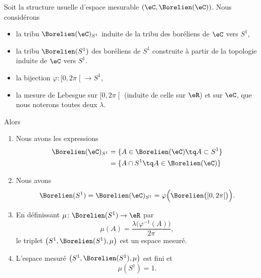 \begin{proposition}      \label{PROPooHMSCooRIjcJq}
	Soit la structure usuelle d'espace mesurable \( (\eC,\Borelien(\eC))\). Nous considérons
	\begin{itemize}
		\item la tribu \( \Borelien(\eC)_{S^1}\) induite de la tribu des boréliens  de \( \eC\) vers \( S^1\),
		\item la tribu \( \Borelien(S^1)\) des boréliens de \( S^1\) construite à partir de la topologie induite de \( \eC\) vers \( S^1\).
		\item la bijection \( \varphi\colon \mathopen[ 0 , 2\pi \mathclose[\to S^1\),
		\item la mesure de Lebesgue sur \( \mathopen[ 0 , 2\pi \mathclose[\) (induite de celle sur \( \eR\)) et sur \( \eC\), que nous noterons toutes deux \( \lambda\).
	\end{itemize}
	Alors
	\begin{enumerate}
		\item       \label{ITEMooSUNEooRhAdep}
		      Nous avons les expressions
		      \begin{subequations}
			      \begin{align}
				      \Borelien(\eC)_{S^1} & =\{A\in\Borelien(\eC)\tq A\subset S^1\}                                \\
				                           & =\{A\cap S^1\tq A\in\Borelien(\eC)\}       \label{SUBEQooYZGCooDqXmft}
			      \end{align}
		      \end{subequations}
		\item       \label{ITEMooGYPNooRaZbNW}
		      Nous avons
		      \begin{equation}
			      \Borelien(S^1) = \Borelien(\eC)_{S^1}=\varphi\Big( \Borelien\big( \mathopen[ 0 , 2\pi \mathclose[ \big) \Big).
		      \end{equation}
		\item       \label{ITEMooFUXKooFQdoaw}
		      En définissant \( \mu\colon \Borelien(S^1)\to \eR\) par
		      \begin{equation}         \label{EQooKHZRooSrFMdo}
			      \mu(A)=\frac{ \lambda\big( \varphi^{-1}(A) \big) }{ 2\pi },
		      \end{equation}
		      le triplet \( \big( S^1,\Borelien(S^1), \mu \big)\) est un espace mesuré.
		\item       \label{ITEMooBQLRooOsqesg}
		      L'espace mesuré \( \big( S^1,\Borelien(S^1), \mu \big)\) est fini et
		      \begin{equation}
			      \mu(S^1)=1.
		      \end{equation}
	\end{enumerate}
\end{proposition}

